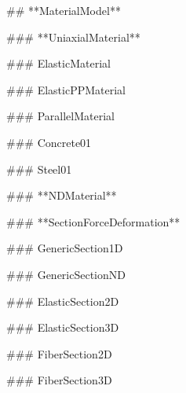 ## **MaterialModel**

### **UniaxialMaterial**

### ElasticMaterial

### ElasticPPMaterial

### ParallelMaterial

### Concrete01

### Steel01

### **NDMaterial**

### **SectionForceDeformation**

### GenericSection1D

### GenericSectionND

### ElasticSection2D

### ElasticSection3D

### FiberSection2D

### FiberSection3D
